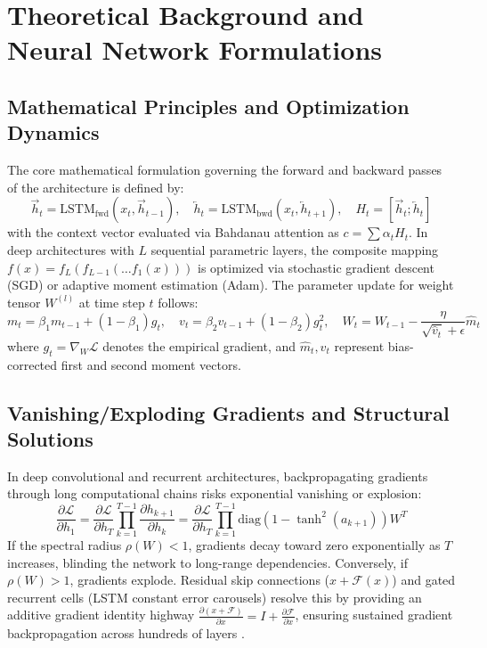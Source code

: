 \section{Theoretical Background and Neural Network Formulations}

\subsection{Mathematical Principles and Optimization Dynamics}
The core mathematical formulation governing the forward and backward passes of the architecture is defined by:
\begin{equation}
  \vec{h}_t = \text{LSTM}_{\text{fwd}}(x_t, \vec{h}_{t-1}), \quad \overleftarrow{h}_t = \text{LSTM}_{\text{bwd}}(x_t, \overleftarrow{h}_{t+1}), \quad H_t = [\vec{h}_t; \overleftarrow{h}_t]
\label{eq:core_math}
\end{equation}
with the context vector evaluated via Bahdanau attention as $c = \sum \alpha_t H_t$.
In deep architectures with $L$ sequential parametric layers, the composite mapping $f(x) = f_L(f_{L-1}(\dots f_1(x)))$ is optimized via stochastic gradient descent (SGD) or adaptive moment estimation (Adam). The parameter update for weight tensor $W^{(l)}$ at time step $t$ follows:
\begin{equation}
  m_t = \beta_1 m_{t-1} + (1 - \beta_1) g_t, \quad v_t = \beta_2 v_{t-1} + (1 - \beta_2) g_t^2, \quad W_t = W_{t-1} - \frac{\eta}{\sqrt{\hat{v}_t} + \epsilon} \hat{m}_t
\end{equation}
where $g_t = \nabla_W \mathcal{L}$ denotes the empirical gradient, and $\hat{m}_t, \hat{v}_t$ represent bias-corrected first and second moment vectors.

\subsection{Vanishing/Exploding Gradients and Structural Solutions}
In deep convolutional and recurrent architectures, backpropagating gradients through long computational chains risks exponential vanishing or explosion:
\begin{equation}
  \frac{\partial \mathcal{L}}{\partial h_1} = \frac{\partial \mathcal{L}}{\partial h_T} \prod_{k=1}^{T-1} \frac{\partial h_{k+1}}{\partial h_k} = \frac{\partial \mathcal{L}}{\partial h_T} \prod_{k=1}^{T-1} \text{diag}(1 - \tanh^2(a_{k+1})) W^T
\end{equation}
If the spectral radius $\rho(W) < 1$, gradients decay toward zero exponentially as $T$ increases, blinding the network to long-range dependencies. Conversely, if $\rho(W) > 1$, gradients explode. Residual skip connections ($x + \mathcal{F}(x)$) and gated recurrent cells (LSTM constant error carousels) resolve this by providing an additive gradient identity highway $\frac{\partial (x + \mathcal{F})}{\partial x} = I + \frac{\partial \mathcal{F}}{\partial x}$, ensuring sustained gradient backpropagation across hundreds of layers \cite{he2016deep, hochreiter1997long}.

